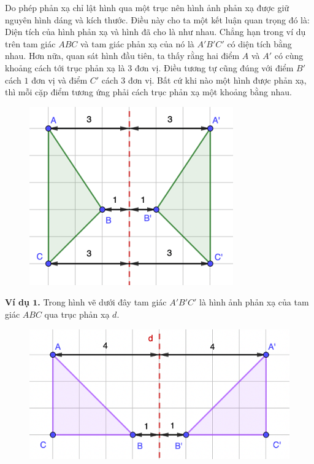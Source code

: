 \begin{multicols}{2}
\begin{figure}[H]
		\vspace*{-15pt}
	\end{figure}
	Do phép phản xạ chỉ lật hình qua một trục nên hình ảnh phản xạ được giữ nguyên hình dáng và kích thước. Điều này cho ta một kết luận quan trọng đó là: Diện tích của hình phản xạ và hình đã cho là như nhau. Chẳng hạn trong ví dụ trên tam giác $ABC$ và tam giác phản xạ của nó là $A'B'C'$ có diện tích bằng nhau. Hơn nữa, quan sát hình đầu tiên, ta thấy rằng hai điểm $A$ và $A'$ có cùng khoảng cách tới trục phản xạ là $3$ đơn vị. Điều tương tự cũng đúng với điểm $B'$ cách $1$ đơn vị và điểm $C'$ cách $3$ đơn vị. Bất cứ khi nào một hình được phản xạ, thì mỗi cặp điểm tương ứng phải cách trục phản xạ một khoảng bằng nhau. 
	\begin{figure}[H]
		\vspace*{-5pt}
		\centering
		\captionsetup{labelformat= empty, justification=centering}
		\includegraphics[scale=0.8]{Picture4}
		\vspace*{-5pt}
	\end{figure}
	\textbf{\color{toancuabi}Ví dụ $\pmb1$.} Trong hình vẽ dưới đây tam giác $A'B'C'$ là hình ảnh phản xạ của tam giác $ABC$ qua trục phản xạ $d$.
	\begin{figure}[H]
		\vspace*{-5pt}
		\centering
		\captionsetup{labelformat= empty, justification=centering}
		\includegraphics[width= 0.8\linewidth]{Picture5}

\end{figure}
\end{multicols}
